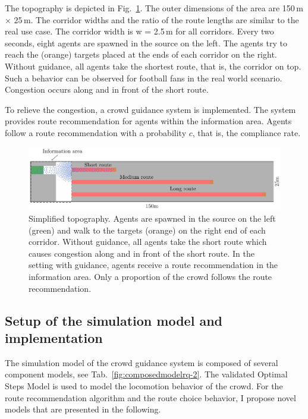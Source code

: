 The topography is depicted in Fig.~\ref{fig:designumleitalg}. The outer dimensions of the area are 150\,m $\times$ 25\,m. The corridor widths and the ratio of the route lengths are similar to the real use case. The corridor width is w = 2.5\,m for all corridors. Every two seconds, eight agents are spawned in the source on the left. The agents try to reach the (orange) targets placed at the ends of each corridor on the right. Without guidance, all agents take the shortest route, that is, the corridor on top. Such a behavior can be observed for football fans in the real world scenario. Congestion occurs along and in front of the short route. 

To relieve the congestion, a crowd guidance system is implemented. The system provides route recommendation for agents within the information area. Agents follow a route recommendation with a probability $c$, that is, the compliance rate.


\begin{figure}[hbt!]
\includegraphics[width=\textwidth]{figures/investigation/VergleichUmleitalgorithmen/Scenario.pdf} 
\caption[Simplified topography]{Simplified topography. Agents are spawned in the source on the left (green) and walk to the targets (orange) on the right end of each corridor. Without guidance, all agents take the short route which causes congestion along and in front of the short route. In the setting with guidance, agents receive a route recommendation in the information area.  Only a proportion of the crowd follows the route recommendation.}
\label{fig:designumleitalg} 
\end{figure}




\subsection{Setup of the simulation model and implementation}


The simulation model of the crowd guidance system is composed of several component models, see Tab.~\ref{fig:composedmodelrq-2}. The validated Optimal Steps Model is used to model the locomotion behavior of the crowd. For the route recommendation algorithm and the route choice behavior, I propose novel models that are presented in the following. 


